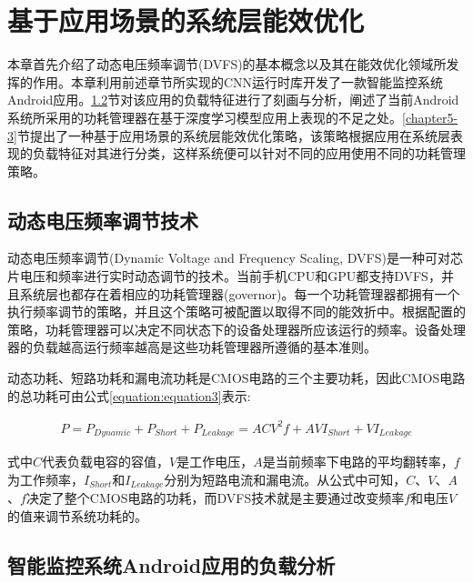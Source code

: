 \chapter{基于应用场景的系统层能效优化}

本章首先介绍了动态电压频率调节(DVFS)的基本概念以及其在能效优化领域所发挥的作用。本章利用前述章节所实现的CNN运行时库开发了一款智能监控系统Android应用。\ref{chapter5-2}节对该应用的负载特征进行了刻画与分析，阐述了当前Android系统所采用的功耗管理器在基于深度学习模型应用上表现的不足之处。\ref{chapter5-3}节提出了一种基于应用场景的系统层能效优化策略，该策略根据应用在系统层表现的负载特征对其进行分类，这样系统便可以针对不同的应用使用不同的功耗管理策略。

\section{动态电压频率调节技术}

动态电压频率调节(Dynamic Voltage and Frequency Scaling, DVFS)是一种可对芯片电压和频率进行实时动态调节的技术。当前手机CPU和GPU都支持DVFS，并且系统层也都存在着相应的功耗管理器(governor)。每一个功耗管理器都拥有一个执行频率调节的策略，并且这个策略可被配置以取得不同的能效折中。根据配置的策略，功耗管理器可以决定不同状态下的设备处理器所应该运行的频率。设备处理器的负载越高运行频率越高是这些功耗管理器所遵循的基本准则。

动态功耗\cite{benini1999policy}、短路功耗\cite{周宽久2010嵌入式软硬件低功耗优化研究综述倡}和漏电流功耗\cite{you2006compilers}是CMOS电路的三个主要功耗，因此CMOS电路的总功耗可由公式\ref{equation:equation3}表示:

\begin{equation}
     \label{equation:equation3}
     \begin{aligned}
        P = P_{Dynamic} + P_{Short} + P_{Leakage}
         = ACV^2f +  AVI_{Short} + VI_{Leakage}
     \end{aligned}
\end{equation}

式中$C$代表负载电容的容值，$V$是工作电压，$A$是当前频率下电路的平均翻转率，$f$为工作频率，$I_{Short}$和$I_{Leakage}$分别为短路电流和漏电流。从公式中可知，$C$、$V$、$A$、$f$决定了整个CMOS电路的功耗，而DVFS技术就是主要通过改变频率$f$和电压$V$的值来调节系统功耗的。


\section{智能监控系统Android应用的负载分析}
\label{chapter5-2}

